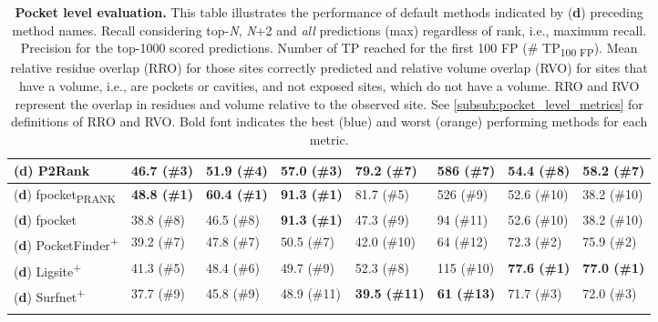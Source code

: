 \begin{landscape}
\begin{longtable}[c]{|M{29mm}|M{29mm}|M{31mm}|M{27mm}|M{30mm}|M{19mm}|M{18mm}|M{18mm}|}
\footnotesize{(\textbf{d})} P2Rank         & 46.7 (\#3)            & 51.9 (\#4)             & 57.0 (\#3)           & 79.2 (\#7)           & 586 (\#7)         & 54.4 (\#8)     & 58.2 (\#7)   \\ \hline
\footnotesize{(\textbf{d})} fpocket\textsubscript{PRANK}        & \textbf{\textcolor{CBBlue}{48.8 (\#1)}}           & \textbf{\textcolor{CBBlue}{60.4 (\#1)}}             & \textbf{\textcolor{CBBlue}{91.3 (\#1)}}         & 81.7 (\#5)           & 526 (\#9)          & 52.6 (\#10)     & 38.2 (\#10)     \\ \hline
\footnotesize{(\textbf{d})} fpocket        & 38.8 (\#8)           & 46.5 (\#8)             & \textbf{\textcolor{CBBlue}{91.3 (\#1)}}         & 47.3 (\#9)           & 94 (\#11)          & 52.6 (\#10)     & 38.2 (\#10)     \\ \hline
\footnotesize{(\textbf{d})} PocketFinder\textsuperscript{+}  & 39.2 (\#7)           & 47.8 (\#7)             & 50.5 (\#7)         & 42.0 (\#10)             & 64 (\#12)          & 72.3 (\#2)     & 75.9 (\#2)     \\ \hline
\footnotesize{(\textbf{d})} Ligsite\textsuperscript{+}       & 41.3 (\#5)           & 48.4 (\#6)             & 49.7 (\#9)         & 52.3 (\#8)           & 115 (\#10)         & \textbf{\textcolor{CBBlue}{77.6 (\#1)}}             & \textbf{\textcolor{CBBlue}{77.0 (\#1)}}             \\ \hline
\footnotesize{(\textbf{d})} Surfnet\textsuperscript{+}       & 37.7 (\#9)           & 45.8 (\#9)             & 48.9 (\#11)         & \textbf{\textcolor{CBOrange}{39.5 (\#11)}}           & \textbf{\textcolor{CBOrange}{61 (\#13)}}                  & 71.7 (\#3)     & 72.0 (\#3)     \\ \hline
\caption[Pocket level evaluation]{\textbf{Pocket level evaluation.} This table illustrates the performance of default methods indicated by (\textbf{d}) preceding method names. Recall considering top-\textit{N}, \textit{N}+2 and \textit{all} predictions (max) regardless of rank, i.e., maximum recall. Precision for the top-1000 scored predictions. Number of TP reached for the first 100 FP (\# TP\textsubscript{100 FP}). Mean relative residue overlap (RRO) for those sites correctly predicted and relative volume overlap (RVO) for sites that have a volume, i.e., are pockets or cavities, and not exposed sites, which do not have a volume. RRO and RVO represent the overlap in residues and volume relative to the observed site. See \autoref{subsub:pocket_level_metrics} for definitions of RRO and RVO. Bold font indicates the best (blue) and worst (orange) performing methods for each metric.}
\label{tab:pocket_level_benchmark}\\
\end{longtable}
\end{landscape}
\endgroup

